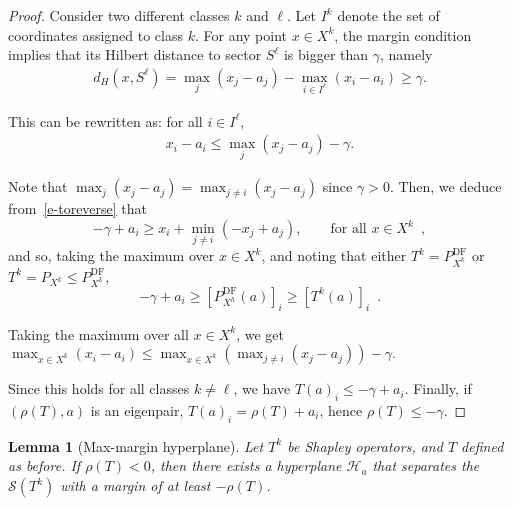 \documentclass{article}
\newtheorem{lemma}[theorem]{Lemma}
\newcommand{\Pdiagfree}{P^{\text{DF}}}
\renewcommand{\geq}{\geqslant}
\renewcommand{\leq}{\leqslant}
\begin{document}
\begin{proof}
Consider two different classes $k$ and $\ell$. Let $I^k$ denote the set of coordinates assigned to class $k$. For any point $x \in X^k$, the margin condition implies that its Hilbert distance to sector $S^{\ell}$ is bigger than $\gamma$, namely
\begin{align}
d_H(x, S^{\ell}) = \max_j(x_j - a_j) - \max_{i \in I^{\ell}}(x_i - a_i) \geq \gamma.
\end{align}

This can be rewritten as: for all $i \in I^{\ell}$,
\begin{align}
x_i - a_i \leq \max_j(x_j - a_j) - \gamma.\label{e-toreverse}
\end{align}

Note that $ \max_j(x_j - a_j) = \max_{j\neq i}(x_j - a_j) $ since $\gamma >0$.
Then, we deduce from~\eqref{e-toreverse} that
\[
-\gamma + a_i \geq x_i +\min_{j\neq i} (-x_j + a_j) ,\qquad \text{for all }x\in X^k \enspace,
\]
and so, taking the maximum over $x\in X^k$, and noting that either $T^k=\Pdiagfree_{X^k}$ or
$T^k=P_{X^k}\leq \Pdiagfree_{X^k}$,
\[
-\gamma  + a_i \geq [\Pdiagfree_{X^h}(a)]_i \geq [T^k(a)]_i\enspace .
\]

Taking the maximum over all $x \in X^k$, we get
\(
\max_{x \in X^k}(x_i - a_i) \leq \max_{x \in X^k}\left(\max_{j\neq i}(x_j - a_j)\right) - \gamma.
\)

Since this holds for all classes $k \neq \ell$, we have $T(a)_i \leq -\gamma + a_i$.
Finally, if $(\rho(T),a)$ is an eigenpair, $T(a)_i=\rho(T)+a_i$, hence $\rho(T)\le -\gamma$.
\end{proof}

\begin{lemma}[Max-margin hyperplane]\label{lemma:operator_to_hyperplane}
Let $T^k$ be Shapley operators, and $T$ defined as before. If $\rho(T) < 0$, then there exists a hyperplane $\mathcal{H}_a$ that separates the $\mathcal{S}(T^k)$ with a margin of at least $-\rho(T)$.
\end{lemma}
\end{document}
